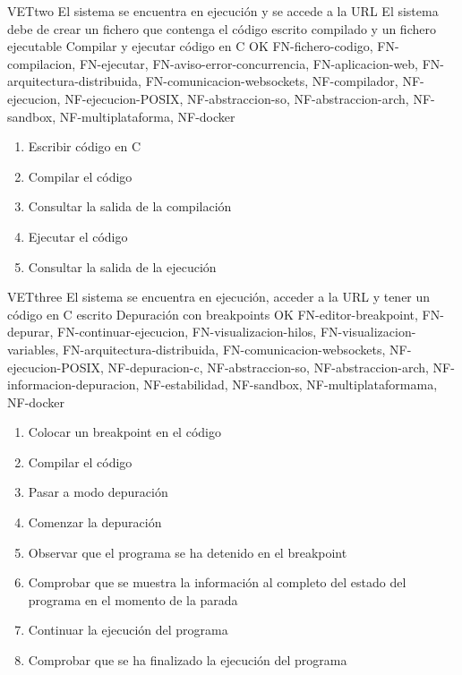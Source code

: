     \begin{testCase}{VET}{two}
        {El sistema se encuentra en ejecución y se accede a la URL}
        {El sistema debe de crear un fichero que contenga el código escrito compilado y un fichero ejecutable}
        {Compilar y ejecutar código en C}
        {OK}
        {FN-fichero-codigo, FN-compilacion, FN-ejecutar, FN-aviso-error-concurrencia, FN-aplicacion-web, FN-arquitectura-distribuida, FN-comunicacion-websockets, NF-compilador, NF-ejecucion, NF-ejecucion-POSIX, NF-abstraccion-so, NF-abstraccion-arch, NF-sandbox, NF-multiplataforma, NF-docker}
        \begin{enumerate}
            \item Escribir código en C
            \item Compilar el código
            \item Consultar la salida de la compilación
            \item Ejecutar el código
            \item Consultar la salida de la ejecución
        \end{enumerate}
    \end{testCase}

    \begin{testCase}{VET}{three}
        {El sistema se encuentra en ejecución, acceder a la URL y tener un código en C escrito}
        {\NA}
        {Depuración con breakpoints}
        {OK}
        {FN-editor-breakpoint, FN-depurar, FN-continuar-ejecucion, FN-visualizacion-hilos, FN-visualizacion-variables, FN-arquitectura-distribuida, FN-comunicacion-websockets, NF-ejecucion-POSIX, NF-depuracion-c, NF-abstraccion-so, NF-abstraccion-arch, NF-informacion-depuracion, NF-estabilidad, NF-sandbox, NF-multiplataformama, NF-docker}
        \begin{enumerate}
            \item Colocar un breakpoint en el código
            \item Compilar el código
            \item Pasar a modo depuración
            \item Comenzar la depuración
            \item Observar que el programa se ha detenido en el breakpoint
            \item Comprobar que se muestra la información al completo del estado del programa en el momento de la parada
            \item Continuar la ejecución del programa
            \item Comprobar que se ha finalizado la ejecución del programa
        \end{enumerate}
    \end{testCase}

